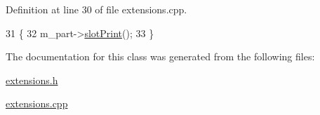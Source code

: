 Definition at line 30 of file extensions.\+cpp.


\begin{DoxyCode}
31 \{
32     m\_part->\hyperlink{classOkular_1_1Part_ae4a132e628da6312254409b6d4813874}{slotPrint}();
33 \}
\end{DoxyCode}


The documentation for this class was generated from the following files\+:\begin{DoxyCompactItemize}
\item 
\hyperlink{extensions_8h}{extensions.\+h}\item 
\hyperlink{extensions_8cpp}{extensions.\+cpp}\end{DoxyCompactItemize}
